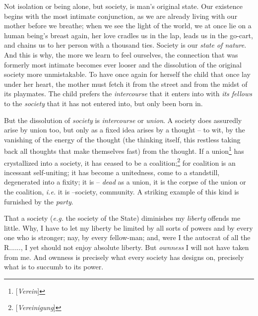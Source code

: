 \documentclass[12pt,a4paper]{book}
\begin{document}
Not isolation or being alone, but society, is man's original state. Our 
existence begins with the most intimate conjunction, as we are already living 
with our mother before we breathe; when we see the light of the world, we at 
once lie on a human being's breast again, her love cradles us in the lap, 
leads us in the go-cart, and chains us to her person with a thousand ties. 
Society is our \textit{state of nature}. And this is why, the more we learn to 
feel ourselves, the connection that was formerly most intimate becomes ever 
looser and the dissolution of the original society more unmistakable. To have 
once again for herself the child that once lay under her heart, the mother 
must fetch it from the street and from the midst of its playmates. The child 
prefers the \textit{intercourse} that it enters into with \textit{its fellows} 
to the \textit{society} that it has not entered into, but only been born in.

But the dissolution of \textit{society} is \textit{intercourse} or 
\textit{union}. A society does assuredly arise by union too, but only as a 
fixed idea arises by a thought -- to wit, by the vanishing of the energy of 
the thought (the thinking itself, this restless taking back all thoughts that 
make themselves fast) from the thought. If a union\footnote{[\textit{Verein}]} 
has crystallized into a society, it has ceased to be a 
coalition;\footnote{[\textit{Vereinigung}]} for coalition is an incessant 
self-uniting; it has become a unitedness, come to a standstill, degenerated 
into a fixity; it is -- \textit{dead} as a union, it is the corpse of the 
union or the coalition, \textit{i.e.} it is --society, community. A striking 
example of this kind is furnished by the \textit{party}.

That a society (\textit{e.g.} the society of the State) diminishes my 
\textit{liberty} offends me little. Why, I have to let my liberty be limited 
by all sorts of powers and by every one who is stronger; nay, by every 
fellow-man; and, were I the autocrat of all the R......, I yet should not 
enjoy absolute liberty. But \textit{ownness} I will not have taken from me. 
And ownness is precisely what every society has designs on, precisely what is 
to succumb to its power.
\end{document}
